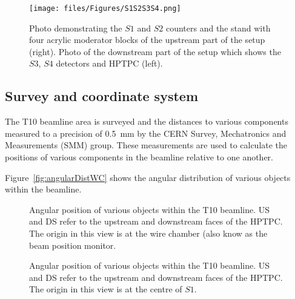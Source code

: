 \begin{figure}[t]
  \centering
  \texttt{[image: files/Figures/S1S2S3S4.png]}
  \caption{Photo demonstrating the $\mathit{S1}$ and $\mathit{S2}$ counters and the stand with four acrylic moderator blocks of the upstream part of the setup (right). Photo of the downstream part of the setup which shows the $\mathit{S3}$, $\mathit{S4}$ detectors and HPTPC (left).}
  \label{fig:modblocks}
\end{figure}

\subsection{Survey and coordinate system}
The T10 beamline area is surveyed and the distances to various components measured to a precision of 0.5~mm by the CERN Survey, Mechatronics and Measurements (SMM) group.
These measurements are used to calculate the positions of various components in the beamline relative to one another.

Figure~\ref{fig:angularDistWC} shows the angular distribution of various objects within the beamline.

\begin{figure}[ht]
  \begin{minipage}[t]{0.49\textwidth}
    \begin{adjustbox}{max totalsize={\textwidth}{.5\textheight},center}
      
    \end{adjustbox}
    \caption{Angular position of various objects within the T10 beamline. US and DS refer to the upstream and downstream faces of the HPTPC. The origin in this view is at the wire chamber (also know as the beam position monitor.}
    \label{fig:angularDistWC}
  \end{minipage}
  \hfill
  \begin{minipage}[t]{0.49\textwidth}
    \begin{adjustbox}{max totalsize={\textwidth}{.5\textheight},center}
      
    \end{adjustbox}
    \caption{Angular position of various objects within the T10 beamline. US and DS refer to the upstream and downstream faces of the HPTPC. The origin in this view is at the centre of $\mathit{S1}$.}
    \label{fig:angularDistS1}
  \end{minipage}
\end{figure}

